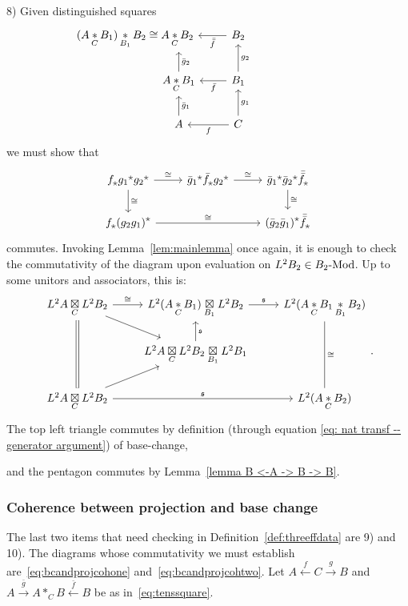 \documentclass[10pt,a4paper,oneside]{amsart}
\theoremstyle{remark}
\theoremstyle{definition}
\newcommand{\lmod}[1]{#1\textnormal{-Mod}}
\newcommand{\tens}[1]{\mathop{*}\limits_{#1}}
\newcommand{\Ltwomap}{\mathfrak{s}}
\newcommand{\vn}[1]{{#1}}
\newcommand{\res}[1]{#1^{\tikz[baseline=-1]{
\draw (0,0) -- (90:.07) (0,0) -- (162:.07) (0,0) -- (234:.07) (0,0) -- (306:.07)(0,0) -- (378:.07);
}}}
\newcommand{\vnres}[1]{\res{\vn{#1}}}
\newcommand{\ind}[1]{#1_{\tikz[baseline=-1]{
\draw (0,0) -- (90:.07) (0,0) -- (162:.07) (0,0) -- (234:.07) (0,0) -- (306:.07)(0,0) -- (378:.07);
}}}
\begin{document}
8) Given distinguished squares
\[
\hspace{-.2cm}
\begin{tikzcd}[baseline=0]
  \hspace{-2.75cm}(A\tens{C} B_1)\tens{B_1} B_2 \cong A\tens{C} B_2  \arrow[<-, r,"\bar{\bar{f}}"']\arrow[<-, d,"\bar{g}_2"]&\arrow[<-, d,"g_2"]B_2\\ A\tens{C} B_1\arrow[<-, r,"\bar{f}"'] \arrow[<-, d,"\bar{g}_1"] & B_1 \arrow[<-, d,"g_1"]\\ A \arrow[<-, r,"f"']& C
\end{tikzcd}
\]
we must show that
\[
\begin{tikzcd}
\ind{f}\vnres{g_1{}}\vnres{g_2{}}\arrow[r,"\cong"]\arrow[d,"\cong"]& \vnres{\bar{g}_1{}}\ind{\bar{f}}\vnres{g_2{}}\arrow[r,"\cong"] &\vnres{\bar{g}_1{}}\vnres{\bar{g}_2{}} \ind{\bar{\bar{f}}} \arrow[d,"\cong"]\\
\ind{f}\vnres{(g_2g_1)} \arrow[rr,"\cong"] & & \vnres{(\bar{g}_2\bar{g}_1)}\ind{\bar{\bar{f}}}
\end{tikzcd}
\]
commutes.
Invoking Lemma~\ref{lem:mainlemma} once again, it is enough to check the commutativity of the diagram upon evaluation on $L^2B_2\in\lmod{B_2}$. Up to some unitors and associators, this is:
\[
\begin{tikzcd}
L^2A\underset{C}\boxtimes L^2B_2\arrow[r,"\cong"]\arrow[-, dd, double, double distance=2]& L^2(A\tens{C}B_1)\underset{B_1}\boxtimes L^2B_2\arrow[r,"\Ltwomap"] &L^2(
A\tens{C} B_1\tens{B_1} B_2) \arrow[-, dd, "\cong"]\\
&
L^2A\underset{C}\boxtimes L^2B_2\underset{B_1}\boxtimes L^2B_1
\arrow[u, "\Ltwomap"'] \arrow[<-, shorten <=8, shorten >=-7, lu] \arrow[<-, shorten >=1, shorten <=-5,ld]
\\
L^2A\underset{C}\boxtimes L^2B_2 \arrow[rr,"\Ltwomap"] & & L^2(A\tens{C}B_2)
\end{tikzcd}.
\]
The top left triangle commutes by definition  (through equation \eqref{eq: nat transf -- generator argument}) of base-change,

and the pentagon commutes by Lemma~\ref{lemma B <-A -> B -> B}.

\subsubsection{Coherence between projection and base change}
The last two items that need checking in Definition~\ref{def:threeffdata} are 9) and 10).\vspace{-1mm}
The diagrams whose commutativity we must establish are~\eqref{eq:bcandprojcohone} and~\eqref{eq:bcandprojcohtwo}.
Let $A\stackrel{f} \leftarrow C\stackrel{g} \rightarrow B$ and 
$A\stackrel{\bar g} \rightarrow A\ast_{C} B\stackrel{\bar f} \leftarrow B$
be as in~\eqref{eq:tenssquare}.
\end{document}

